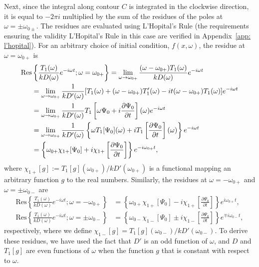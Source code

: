 \documentclass[12pt]{../style-files/ociamthesis}
\begin{document}
Next, since the integral along contour $C$ is integrated in the clockwise direction, it is equal to $-2\pi i$ multiplied by the sum of the residues of the poles at $\omega = \pm \omega_{0\pm}$. The residues are evaluated using L'Hopital's Rule (the requirements ensuring the validity L'Hopital's Rule in this case are verified in Appendix~\ref{app: l'hopital}). For an arbitrary choice of initial condition, $f(x,\omega)$, the residue at $\omega = \omega_{0+}$ is
\begin{align}
\mathrm{Res}&\left\{\frac{T_1(\omega)}{kD(\omega)}e^{-i\omega t}; \omega = \omega_{0+} \right\} = 
\lim_{\omega \to \omega_{0+}} \frac{(\omega - \omega_{0+})T_1(\omega)}{kD(\omega)} e^{-i\omega t} \notag \\ 
&= \lim_{\omega \to \omega_{0+}} \frac{1}{kD'(\omega)} [T_1(\omega) + (\omega - \omega_{0+})T'_1(\omega) - it(\omega - \omega_{0+})T_1(\omega)]e^{-i\omega t} \notag \\
&= \lim_{\omega \to \omega_{0+}} \frac{1}{kD'(\omega)} T_1\left[\omega \Psi_0 + i\frac{\partial \Psi_0}{\partial t}\right](\omega) e^{-i\omega t} \notag \\
&= \lim_{\omega \to \omega_{0+}} \frac{1}{kD'(\omega)} \left\{ \omega T_1[\Psi_0](\omega) + iT_1\left[\frac{\partial \Psi_0}{\partial t}\right](\omega) \right\} e^{-i\omega t} \notag \\
&= \left\{ \omega_{0+} \chi_{1+}[\Psi_0] + i\chi_{1+}\left[\frac{\partial \Psi_0}{\partial t}\right] \right\} e^{-i\omega_{0+} t},
\end{align}
where $\chi_{1+}[g] := T_1[g](\omega_{0+}) / kD'(\omega_{0+})$ is a functional mapping an arbitrary function $g$ to the real numbers. Similarly, the residues at $\omega = -\omega_{0+}$ and $\omega = \pm\omega_{0-}$ are
\begin{align}
\mathrm{Res}\left\{\frac{T_1(\omega)}{kD(\omega)}e^{-i\omega t}; \omega = -\omega_{0+} \right\} &= \left\{ \omega_{0+} \chi_{1+}[\Psi_0] - i\chi_{1+}\left[\frac{\partial \Psi_0}{\partial t}\right] \right\} e^{i\omega_{0+} t}, \\
\mathrm{Res}\left\{\frac{T_1(\omega)}{kD(\omega)}e^{-i\omega t}; \omega = \pm \omega_{0-} \right\} &= \left\{ \omega_{0-} \chi_{1-}[\Psi_0] \pm i\chi_{1-}\left[\frac{\partial \Psi_0}{\partial t}\right] \right\} e^{\mp i\omega_{0-} t},
\end{align}
respectively, where we define $\chi_{1-}[g] = T_1[g](\omega_{0-}) / kD'(\omega_{0-})$. To derive these residues, we have used the fact that $D'$ is an odd function of $\omega$, and $D$ and $T_1[g]$ are even functions of $\omega$ when the function $g$ that is constant with respect to $\omega$.
\end{document}
